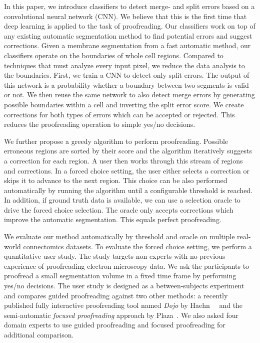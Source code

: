In this paper, we introduce classifiers to detect merge- and split errors based on a convolutional neural network (CNN). We believe that this is the first time that deep learning is applied to the task of proofreading. Our classifiers work on top of any existing automatic segmentation method to find potential errors and suggest corrections. Given a membrane segmentation from a fast automatic method, our classifiers operate on the boundaries of whole cell regions. Compared to techniques that must analyze every input pixel, we reduce the data analysis to the boundaries. First, we train a CNN to detect only split errors. The output of this network is a probability whether a boundary between two segments is valid or not. We then reuse the same network to also detect merge errors by generating possible boundaries within a cell and inverting the split error score. We create corrections for both types of errors which can be accepted or rejected. This reduces the proofreading operation to simple yes/no decisions.

We further propose a greedy algorithm to perform proofreading. Possible erroneous regions are sorted by their score and the algorithm iteratively suggests a correction for each region. A user then works through this stream of regions and corrections. In a forced choice setting, the user either selects a correction or skips it to advance to the next region. This choice can be also performed automatically by running the algorithm until a configurable threshold is reached. In addition, if ground truth data is available, we can use a selection oracle to drive the forced choice selection. The oracle only accepts corrections which improve the automatic segmentation. This equals perfect proofreading.

We evaluate our method automatically by threshold and oracle on multiple real-world connectomics datasets. To evaluate the forced choice setting, we perform a quantitative user study. The study targets non-experts with no previous experience of proofreading electron microscopy data. We ask the participants to proofread a small segmentation volume in a fixed time frame by performing yes/no decisions. The user study is designed as a between-subjects experiment and compares guided proofreading against two other methods: a recently published fully interactive proofreading tool named \textit{Dojo} by Haehn~\etal~\cite{haehn_dojo_2014} and the semi-automatic \textit{focused proofreading} approach by Plaza~\cite{focused_proofreading}. We also asked four domain experts to use guided proofreading and focused proofreading for additional comparison.

